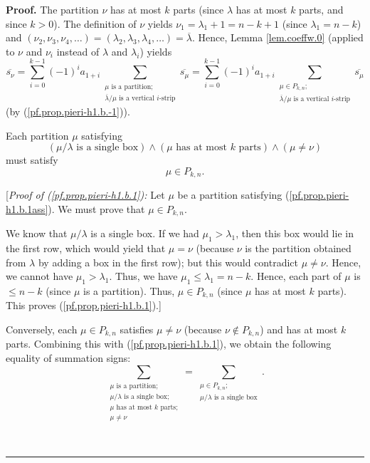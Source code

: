 \documentclass[numbers=enddot,12pt,final,onecolumn,notitlepage]{scrartcl}%
\theoremstyle{definition}
\newenvironment{proof}[1][Proof]{\noindent\textbf{#1.} }{\ \rule{0.5em}{0.5em}}
\let\sumnonlimits\sum
\renewcommand{\sum}{\sumnonlimits\limits}
\begin{document}
\begin{proof}
The partition $\nu$ has at most $k$ parts (since $\lambda$ has at most $k$
parts, and since $k>0$). The definition of $\nu$ yields $\nu_{1}=\lambda
_{1}+1=n-k+1$ (since $\lambda_{1}=n-k$) and $\left(  \nu_{2},\nu_{3},\nu
_{4},\ldots\right)  =\left(  \lambda_{2},\lambda_{3},\lambda_{4}%
,\ldots\right)  =\overline{\lambda}$. Hence, Lemma \ref{lem.coeffw.0} (applied
to $\nu$ and $\nu_{i}$ instead of $\lambda$ and $\lambda_{i}$) yields%
\begin{equation}
\overline{s_{\nu}}=\sum_{i=0}^{k-1}\left(  -1\right)  ^{i}a_{1+i}%
\sum_{\substack{\mu\text{ is a partition;}\\\overline{\lambda}/\mu\text{ is a
vertical }i\text{-strip}}}\overline{s_{\mu}}=\sum_{i=0}^{k-1}\left(
-1\right)  ^{i}a_{1+i}\sum_{\substack{\mu\in P_{k,n};\\\overline{\lambda}%
/\mu\text{ is a vertical }i\text{-strip}}}\overline{s_{\mu}}
\label{pf.prop.pieri-h1.b.0}%
\end{equation}
(by (\ref{pf.prop.pieri-h1.b.-1})).

Each partition $\mu$ satisfying%
\begin{equation}
\left(  \mu/\lambda\text{ is a single box}\right)  \wedge\left(  \mu\text{ has
at most }k\text{ parts}\right)  \wedge\left(  \mu\neq\nu\right)
\label{pf.prop.pieri-h1.b.1ass}%
\end{equation}
must satisfy%
\begin{equation}
\mu\in P_{k,n}. \label{pf.prop.pieri-h1.b.1}%
\end{equation}


[\textit{Proof of (\ref{pf.prop.pieri-h1.b.1}):} Let $\mu$ be a partition
satisfying (\ref{pf.prop.pieri-h1.b.1ass}). We must prove that $\mu\in
P_{k,n}$.

We know that $\mu/\lambda$ is a single box. If we had $\mu_{1}>\lambda_{1}$,
then this box would lie in the first row, which would yield that $\mu=\nu$
(because $\nu$ is the partition obtained from $\lambda$ by adding a box in the
first row); but this would contradict $\mu\neq\nu$. Hence, we cannot have
$\mu_{1}>\lambda_{1}$. Thus, we have $\mu_{1}\leq\lambda_{1}=n-k$. Hence, each
part of $\mu$ is $\leq n-k$ (since $\mu$ is a partition). Thus, $\mu\in
P_{k,n}$ (since $\mu$ has at most $k$ parts). This proves
(\ref{pf.prop.pieri-h1.b.1}).]

Conversely, each $\mu\in P_{k,n}$ satisfies $\mu\neq\nu$ (because $\nu\notin
P_{k,n}$) and has at most $k$ parts. Combining this with
(\ref{pf.prop.pieri-h1.b.1}), we obtain the following equality of summation
signs:%
\begin{equation}
\sum_{\substack{\mu\text{ is a partition;}\\\mu/\lambda\text{ is a single
box;}\\\mu\text{ has at most }k\text{ parts;}\\\mu\neq\nu}}=\sum
_{\substack{\mu\in P_{k,n};\\\mu/\lambda\text{ is a single box}}}.
\label{pf.prop.pieri-h1.b.2}%
\end{equation}



\end{proof}
\end{document}
